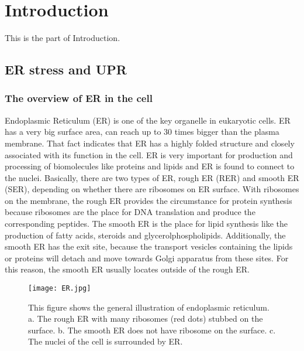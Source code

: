 \chapter{Introduction}
\graphicspath{ {C:/Users/giaccoyu/Desktop/TeXWorks/Fig/Intro/} }
This is the part of Introduction.
\section{ER stress and UPR}
\subsection{The overview of ER in the cell}
Endoplasmic Reticulum (ER) is one of the key organelle in eukaryotic cells. ER has a very big surface area, can reach up to 30 times bigger than the plasma membrane. That fact indicates that ER has a highly folded structure and closely associated with its function in the cell. ER is very important for production and processing of biomolecules like proteins and lipids and ER is found to connect to the nuclei.  Basically, there are two types of ER, rough ER (RER) and smooth ER (SER), depending on whether there are ribosomes on ER surface. With ribosomes on the membrane, the rough ER provides the circumstance for protein synthesis because ribosomes are the place for DNA translation and produce the corresponding peptides. The smooth ER is the place for lipid synthesis like the production of fatty acids, steroids and glycerolphospholipids. Additionally, the smooth ER has the exit site, because the transport vesicles containing the lipids or proteins will detach and move towards Golgi apparatus from these sites. For this reason, the smooth ER usually locates outside of the rough ER.\\
\begin{figure}
	\centering
	\texttt{[image: ER.jpg]}
	\caption[Illustration of two types of endoplasmic reticulum.]
	{This figure shows the general illustration of endoplasmic reticulum. a. The rough ER with many ribosomes (red dots) stubbed on the surface. b. The smooth ER does not have ribosome on the surface. c. The nuclei of the cell is surrounded by ER.}
\end{figure}
